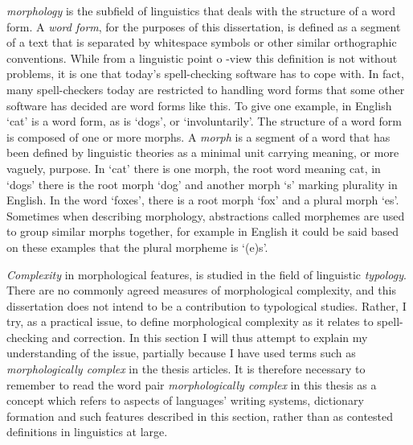 \documentclass[officiallayout,final]{unihelcompling}
\begin{document}
\emph{\Gls{morphology}} is the subfield of linguistics that deals with the
structure of a word form. A \emph{\gls{word form}}, for the purposes of this
dissertation, is defined as a segment of a text that is separated by whitespace
symbols or other similar orthographic conventions. While from a linguistic
point o -view this definition is not without problems, it is one that today's
spell-checking software has to cope with. In fact, many spell-checkers today
are restricted to handling word forms that some other software has decided are
word forms like this. To give one example, in English `cat' is a word form, as
is `dogs', or `involuntarily'. The structure of a word form is composed of one
or more morphs. A \emph{\gls{morph}} is a segment of a word that has been
defined by linguistic theories as a minimal unit carrying meaning, or more
vaguely, purpose. In `cat' there is one morph, the root word meaning cat, in
`dogs' there is the root morph `dog' and another morph `s' marking plurality in
English. In the word `foxes', there is a root morph `fox' and a plural morph
`es'. Sometimes when describing morphology, abstractions called
\glspl{morpheme} are used to group similar morphs together, for example in
English it could be said based on these examples that the plural morpheme is
`(e)s'.

\emph{Complexity} in morphological features, is studied in the field of
linguistic \emph{typology}. There are no commonly agreed measures of
morphological complexity, and this dissertation does not intend to be a
contribution to typological studies. Rather, I try, as a practical issue, to
define morphological complexity as it relates to spell-checking and correction.
In this section I will thus attempt to explain my understanding of the issue,
partially because I have used terms such as \emph{morphologically complex} in
the thesis articles. It is therefore necessary to remember to read the word
pair \emph{morphologically complex} in this thesis as a concept which refers to
aspects of languages' writing systems, dictionary formation and such features
described in this section, rather than as contested definitions in linguistics
at large.
\end{document}
